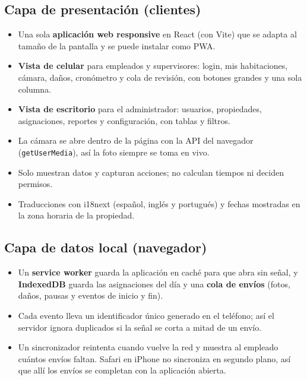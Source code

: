 \documentclass[11pt,a4paper]{article}
\begin{document}
\subsection{Capa de presentación (clientes)}
\begin{itemize}[leftmargin=1.2em]
  \item Una sola \textbf{aplicación web responsive} en React (con Vite) que se adapta al tamaño de la pantalla y se puede instalar como PWA.
  \item \textbf{Vista de celular} para empleados y supervisores: login, mis habitaciones, cámara, daños, cronómetro y cola de revisión, con botones grandes y una sola columna.
  \item \textbf{Vista de escritorio} para el administrador: usuarios, propiedades, asignaciones, reportes y configuración, con tablas y filtros.
  \item La cámara se abre dentro de la página con la API del navegador (\texttt{getUserMedia}), así la foto siempre se toma en vivo.
  \item Solo muestran datos y capturan acciones; no calculan tiempos ni deciden permisos.
  \item Traducciones con i18next (español, inglés y portugués) y fechas mostradas en la zona horaria de la propiedad.
\end{itemize}

\subsection{Capa de datos local (navegador)}
\begin{itemize}[leftmargin=1.2em]
  \item Un \textbf{service worker} guarda la aplicación en caché para que abra sin señal, y \textbf{IndexedDB} guarda las asignaciones del día y una \textbf{cola de envíos} (fotos, daños, pausas y eventos de inicio y fin).
  \item Cada evento lleva un identificador único generado en el teléfono; así el servidor ignora duplicados si la señal se corta a mitad de un envío.
  \item Un sincronizador reintenta cuando vuelve la red y muestra al empleado cuántos envíos faltan. Safari en iPhone no sincroniza en segundo plano, así que allí los envíos se completan con la aplicación abierta.
\end{itemize}
\end{document}
